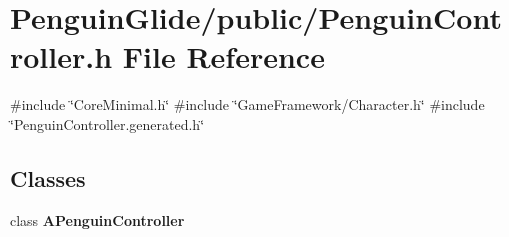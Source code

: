 \section{Penguin\+Glide/public/\+Penguin\+Controller.h File Reference}
\label{_penguin_controller_8h}
{\ttfamily \#include \char`\"{}Core\+Minimal.\+h\char`\"{}}\newline
{\ttfamily \#include \char`\"{}Game\+Framework/\+Character.\+h\char`\"{}}\newline
{\ttfamily \#include \char`\"{}Penguin\+Controller.\+generated.\+h\char`\"{}}\newline
\subsection*{Classes}
\begin{DoxyCompactItemize}
\item 
class \textbf{ A\+Penguin\+Controller}
\end{DoxyCompactItemize}
